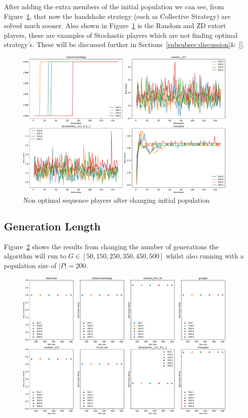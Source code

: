 After adding the extra members of the initial population we can see, from Figure~\ref{fig:NEW-INIT-POP-bs-v-gen-non-performers}, that now the handshake strategy (such as Collective Strategy) are solved much sooner.
Also shown in Figure~\ref{fig:NEW-INIT-POP-bs-v-gen-non-performers} is the Random and ZD extort players, these are examples of Stochastic players which are not finding optimal strategy's.
These will be discussed further in Sections~\ref{subsubsec:discussion}\&~\ref{}.
\begin{figure}[ht]
    \includegraphics[width=1.0\textwidth, center]{./img/plots/NEW_INIT_POP_bs_v_gen_non_performers.pdf}
    \caption{Non optimal sequence players after changing initial population}\label{fig:NEW-INIT-POP-bs-v-gen-non-performers}
\end{figure}

\subsection{Generation Length}\label{subsec:generationLength}
Figure~\ref{fig:NEW-GEN-bs-v-gen-all} shows the results from changing the number of generations the algorithm will run to \(G \in [50,150,250,350,450,500] \) whilst also running with a population size of \(|P|=200\).

\begin{figure}[ht]
    \includegraphics[width=1.0\textwidth, center]{./img/plots/NEW_GEN_bs_v_gen_all.pdf}
    \caption{}\label{fig:NEW-GEN-bs-v-gen-all}
\end{figure}

